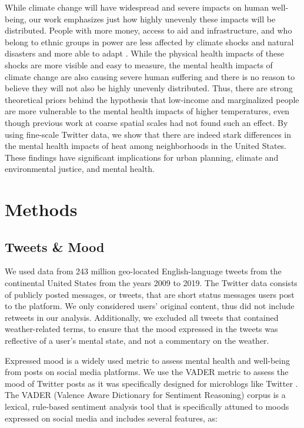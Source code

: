 \documentclass[fleqn,10pt]{wlscirep}
\begin{document}
While climate change will have widespread and severe impacts on human well-being, our work emphasizes just how highly unevenly these impacts will be distributed. People with more money, access to aid and infrastructure, and who belong to ethnic groups in power are less affected by climate shocks and natural disasters and more able to adapt \cite{bullard2012wrong}. While the physical health impacts of these shocks are more visible and easy to measure, the mental health impacts of climate change are also causing severe human suffering and there is no reason to believe they will not also be highly unevenly distributed. Thus, there are strong theoretical priors behind the hypothesis that low-income and marginalized people are more vulnerable to the mental health impacts of higher temperatures, even though previous work at coarse spatial scales had not found such an effect. By using fine-scale Twitter data, we show that there are indeed stark differences in the mental health impacts of heat among neighborhoods in the United States. These findings have significant implications for urban planning, climate and environmental justice, and mental health.

\section*{Methods}
\subsection*{Tweets \& Mood}
We used data from 243 million geo-located English-language tweets from the continental United States from the years 2009 to 2019. The Twitter data consists of publicly posted messages, or tweets, that are short status messages users post to the platform. We only considered users’ original content, thus did not include retweets in our analysis. Additionally, we excluded all tweets that contained weather-related terms, to ensure that the mood expressed in the tweets was reflective of a user's mental state, and not a commentary on the weather.

Expressed mood is a widely used metric to assess mental health and well-being from posts on social media platforms. We use the VADER metric to assess the mood of Twitter posts as it was specifically designed for microblogs like Twitter \cite{hutto2014vader}. The VADER (Valence Aware Dictionary for Sentiment Reasoning) corpus \cite{gilbert_vader_2014} is a lexical, rule-based sentiment analysis tool that is specifically attuned to moods expressed on social media and includes several features, as:
\end{document}
